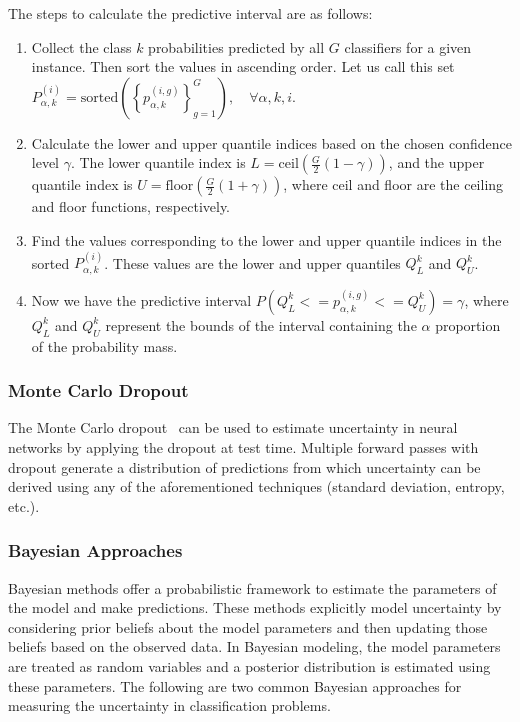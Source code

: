 \documentclass[pdflatex,bst/sn-basic]{bst/sn-jnl}%
\begin{document}
The steps to calculate the predictive interval are as follows:

\begin{enumerate}
    \item Collect the class $k $ probabilities predicted by all $G$ classifiers for a given instance. Then sort the values in ascending order. Let us call this set $P_{\alpha,k}^{(i)}=\mathrm{sorted}\left(\left\{p_{\alpha,k}^{(i,g)}\right\}_{g=1}^G\right),\quad\forall \alpha,k,i $.

    \item Calculate the lower and upper quantile indices based on the chosen confidence level $\gamma $. The lower quantile index is $L=\mathrm{ceil}\left(\frac{G}{2}\left(1-\gamma\right)\right) $, and the upper quantile index is $U=\mathrm{floor}\left(\frac{G}{2} (1+\gamma)\right) $, where ceil and floor are the ceiling and floor functions, respectively.

    \item Find the values corresponding to the lower and upper quantile indices in the sorted $P_{\alpha,k}^{(i)} $. These values are the lower and upper quantiles $Q_L^{k} $ and $Q_U^{k} $.

    \item Now we have the predictive interval $P\left(Q_L^{k}<=p_{\alpha,k}^{(i,g)}<=Q_U^{k}\right)=\gamma $, where $Q_L^{k} $ and $Q_U^{k} $ represent the bounds of the interval containing the $\alpha$ proportion of the probability mass.
\end{enumerate}

\subsubsection{Monte Carlo Dropout}
The Monte Carlo dropout~\cite{gal_Dropout_2016a} can be used to estimate uncertainty in neural networks by applying the dropout at test time. Multiple forward passes with dropout generate a distribution of predictions from which uncertainty can be derived using any of the aforementioned techniques (standard deviation, entropy, etc.).

\subsubsection{Bayesian Approaches}
Bayesian methods offer a probabilistic framework to estimate the parameters of the model and make predictions. These methods explicitly model uncertainty by considering prior beliefs about the model parameters and then updating those beliefs based on the observed data. In Bayesian modeling, the model parameters are treated as random variables and a posterior distribution is estimated using these parameters. The following are two common Bayesian approaches for measuring the uncertainty in classification problems.
\end{document}
